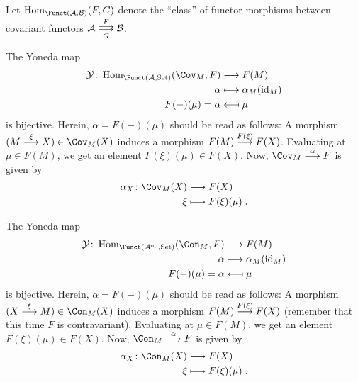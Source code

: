 \documentclass[a4paper,parskip=half,numbers=enddot, DIV=12]{scrreprt}
\begin{document}
	\begin{lem}
        Let $\Hom_{\Funct(\Aa,\Bb)}(F,G)$ denote the ``class'' of functor-morphisms between covariant functors $\Aa\doublemorphism[F][G] \Bb$.
        \begin{alphanumerate}
          \item The Yoneda map
            \begin{align*}
                \Yy\colon\Hom_{\Funct(\Aa,\cat{Set})}(\Cov_M, F) &\longto F(M)\\
                \alpha &\longmapsto \alpha_M(\id_M)\\
                F(-)(\mu) = \alpha &\longmapsfrom \mu
            \end{align*}
            is bijective. Herein, $\alpha=F(-)(\mu)$ should be read as follows: A morphism ${(M\morphism[\xi]X)}\in \Cov_M(X)$ induces a morphism $F(M)\morphism[F(\xi)]F(X)$. Evaluating at $\mu\in F(M)$, we get an element $F(\xi)(\mu)\in F(X)$. Now, $\Cov_M\morphism[\alpha]F$ is given by 
            \begin{align*}
            	\alpha_X\colon\Cov_M(X)&\morphism F(X)\\
            	\xi&\longmapsto F(\xi)(\mu)\;.
            \end{align*}
          \item The Yoneda map
            \begin{align*}
                \Yy\colon\Hom_{\Funct(\Aa^\op,\cat{Set})}(\Con_M, F) &\longto F(M)\\
                \alpha &\longmapsto \alpha_M(\id_M)\\
                F(-)(\mu) = \alpha &\longmapsfrom \mu
            \end{align*}
            is bijective. Herein, $\alpha=F(-)(\mu)$ should be read as follows: A morphism ${(X\morphism[\xi]M)}\in \Con_M(X)$ induces a morphism $F(M)\morphism[F(\xi)]F(X)$ (remember that this time $F$ is contravariant). Evaluating at $\mu\in F(M)$, we get an element $F(\xi)(\mu)\in F(X)$. Now, $\Con_M\morphism[\alpha]F$ is given by 
            \begin{align*}
            \alpha_X\colon\Con_M(X)&\morphism F(X)\\
            \xi&\longmapsto F(\xi)(\mu)\;.
            \end{align*}
        \end{alphanumerate}
	\end{lem}
\end{document}

